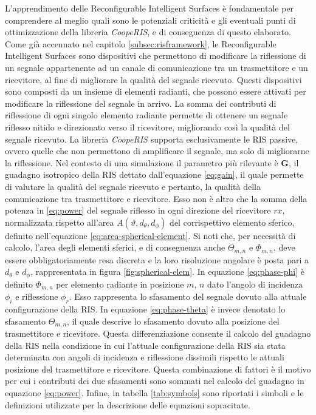 L'apprendimento delle Reconfigurable Intelligent Surfaces è fondamentale per comprendere
al meglio quali sono le potenziali criticità e gli eventuali punti di ottimizzazione
della libreria \textit{CoopeRIS}, e di conseguenza di questo elaborato. Come già
accennato nel capitolo \ref{subsec:risframework}, le Reconfigurable Intelligent Surfaces
sono dispositivi che permettono di modificare la riflessione di un segnale appartenente
ad un canale di comunicazione tra un trasmettitore e un ricevitore, al fine di
migliorare la qualità del segnale ricevuto. Questi dispositivi sono composti da un
insieme di elementi radianti, che possono essere attivati per modificare la
riflessione del segnale in arrivo. La somma dei contributi di riflessione di ogni
singolo elemento radiante permette di ottenere un segnale riflesso nitido e direzionato
verso il ricevitore, migliorando così la qualità del segnale ricevuto. La libreria
\textit{CoopeRIS} supporta esclusivamente le RIS passive, ovvero quelle che non permettono
di amplificare il segnale, ma solo di migliorarne la riflessione. Nel contesto di
una simulazione il parametro più rilevante è $\textbf{G}$, il guadagno
isotropico della RIS dettato dall'equazione \ref{eq:gain}, il quale permette di valutare
la qualità del segnale ricevuto e pertanto, la qualità della comunicazione tra
trasmettitore e ricevitore. Esso non è altro che la somma della potenza in \ref{eq:power}
del segnale riflesso in ogni direzione del ricevitore $rx$, normalizzata
rispetto all'area $A(\vartheta, d_{\theta}, d_{\phi})$ del corrispettivo
elemento sferico, definito nell'equazione \ref{eq:area-spherical-element}. Si
noti che, per necessità di calcolo, l'area degli elementi sferici, e di conseguenza
anche $\Theta_{m,n}$ e $\Phi_{m,n}$, deve essere obbligatoriamente resa discreta
e la loro risoluzione angolare è posta pari a $d_{\theta}$ e $d_{\phi}$, rappresentata
in figura \ref{fig:spherical-elem}. In equazione \ref{eq:phase-phi} è definito
$\Phi_{m,n}$ per elemento radiante in posizione $m$, $n$ dato l'angolo di incidenza
$\phi_{i}$ e riflessione $\phi_{r}$. Esso rappresenta lo sfasamento del segnale
dovuto alla attuale configurazione della RIS. In equazione \ref{eq:phase-theta} è
invece denotato lo sfasamento $\Theta_{m,n}$, il quale descrive lo sfasamento
dovuto alla posizione del trasmettitore e ricevitore. Questa differenziazione consente
il calcolo del guadagno della RIS nella condizione in cui l'attuale configurazione
della RIS sia stata determinata con angoli di incidenza e riflessione dissimili rispetto
le attuali posizione del trasmettitore e ricevitore. Questa combinazione di
fattori è il motivo per cui i contributi dei due sfasamenti sono sommati nel
calcolo del guadagno in equazione \ref{eq:power}. Infine, in tabella
\ref{tab:symbols} sono riportati i simboli e le definizioni utilizzate per la
descrizione delle equazioni sopracitate.

